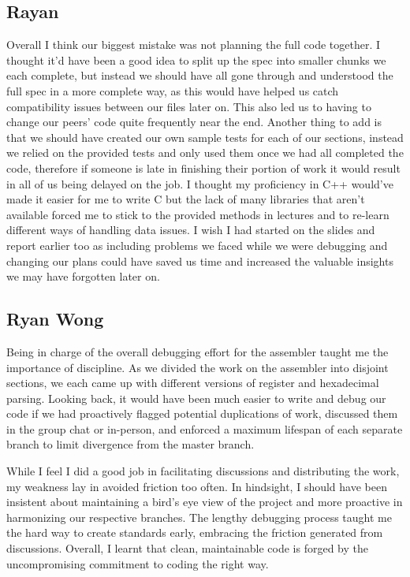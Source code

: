 \documentclass[11pt]{article}
\begin{document}
\subsection{Rayan}
Overall I think our biggest mistake was not planning the full code together. I thought it’d have been a good idea to split up the spec into smaller chunks we each complete, but instead we should have all gone through and understood the full spec in a more complete way, as this would have helped us catch compatibility issues between our files later on. This also led us to having to change our peers’ code quite frequently near the end. Another thing to add is that we should have created our own sample tests for each of our sections, instead we relied on the provided tests and only used them once we had all completed the code, therefore if someone is late in finishing their portion of work it would result in all of us being delayed on the job. I thought my proficiency in C++ would’ve made it easier for me to write C but the lack of many libraries that aren’t available forced me to stick to the provided methods in lectures and to re-learn different ways of handling data issues. I wish I had started on the slides and report earlier too as including problems we faced while we were debugging and changing our plans could have saved us time and increased the valuable insights we may have forgotten later on.


\subsection{Ryan Wong}
Being in charge of the overall debugging effort for the assembler taught me the importance of discipline. As we divided the work on the assembler into disjoint sections, we each came up with different versions of register and hexadecimal parsing. Looking back, it would have been much easier to write and debug our code if we had proactively flagged potential duplications of work, discussed them in the group chat or in-person, and enforced a maximum lifespan of each separate branch to limit divergence from the master branch. 

While I feel I did a good job in facilitating discussions and distributing the work, my weakness lay in avoided friction too often. In hindsight, I should have been insistent about maintaining a bird's eye view of the project and more proactive in harmonizing our respective branches. The lengthy debugging process taught me the hard way to create standards early, embracing the friction generated from discussions. Overall, I learnt that clean, maintainable code is forged by the uncompromising commitment to coding the right way.
\end{document}
